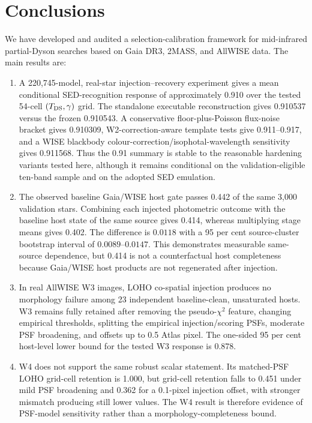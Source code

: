 \documentclass[fleqn,usenatbib]{mnras}
\begin{document}
\section{Conclusions}

We have developed and audited a selection-calibration framework for mid-infrared partial-Dyson searches based on Gaia DR3, 2MASS, and AllWISE data. The main results are:

\begin{enumerate}
\item A 220,745-model, real-star injection--recovery experiment gives a mean conditional SED-recognition response of approximately 0.910 over the tested 54-cell $(T_{\rm DS},\gamma)$ grid. The standalone executable reconstruction gives 0.910537 versus the frozen 0.910543. A conservative floor-plus-Poisson flux-noise bracket gives 0.910309, W2-correction-aware template tests give 0.911--0.917, and a WISE blackbody colour-correction/isophotal-wavelength sensitivity gives 0.911568. Thus the 0.91 summary is stable to the reasonable hardening variants tested here, although it remains conditional on the validation-eligible ten-band sample and on the adopted SED emulation.

\item The observed baseline Gaia/WISE host gate passes 0.442 of the same 3,000 validation stars. Combining each injected photometric outcome with the baseline host state of the same source gives 0.414, whereas multiplying stage means gives 0.402. The difference is $0.0118$ with a 95 per cent source-cluster bootstrap interval of $0.0089$--$0.0147$. This demonstrates measurable same-source dependence, but 0.414 is not a counterfactual host completeness because Gaia/WISE host products are not regenerated after injection.

\item In real AllWISE W3 images, LOHO co-spatial injection produces no morphology failure among 23 independent baseline-clean, unsaturated hosts. W3 remains fully retained after removing the pseudo-$\chi^2$ feature, changing empirical thresholds, splitting the empirical injection/scoring PSFs, moderate PSF broadening, and offsets up to 0.5 Atlas pixel. The one-sided 95 per cent host-level lower bound for the tested W3 response is 0.878.

\item W4 does not support the same robust scalar statement. Its matched-PSF LOHO grid-cell retention is 1.000, but grid-cell retention falls to 0.451 under mild PSF broadening and 0.362 for a 0.1-pixel injection offset, with stronger mismatch producing still lower values. The W4 result is therefore evidence of PSF-model sensitivity rather than a morphology-completeness bound.


\end{enumerate}
\end{document}

